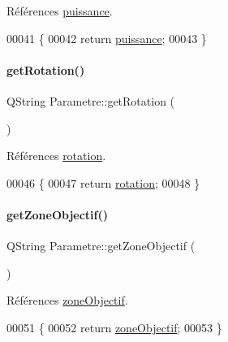 Références \hyperlink{class_parametre_aace4f0265742e479043b3e2afa33771e}{puissance}.


\begin{DoxyCode}
00041 \{
00042     \textcolor{keywordflow}{return} \hyperlink{class_parametre_aace4f0265742e479043b3e2afa33771e}{puissance};
00043 \}
\end{DoxyCode}
\mbox{\label{class_parametre_afdfb5ca638add3954d257ff95a8d8c53}} 
\paragraph{\texorpdfstring{get\+Rotation()}{getRotation()}}
{\footnotesize\ttfamily Q\+String Parametre\+::get\+Rotation (\begin{DoxyParamCaption}{ }\end{DoxyParamCaption})}



Références \hyperlink{class_parametre_ab8cd796bb232cba0abe0aab5b02ae52b}{rotation}.


\begin{DoxyCode}
00046 \{
00047     \textcolor{keywordflow}{return} \hyperlink{class_parametre_ab8cd796bb232cba0abe0aab5b02ae52b}{rotation};
00048 \}
\end{DoxyCode}
\mbox{\label{class_parametre_a2655cf5e0a69873da17dff9f51b4af70}} 
\paragraph{\texorpdfstring{get\+Zone\+Objectif()}{getZoneObjectif()}}
{\footnotesize\ttfamily Q\+String Parametre\+::get\+Zone\+Objectif (\begin{DoxyParamCaption}{ }\end{DoxyParamCaption})}



Références \hyperlink{class_parametre_a5c1b739e1a70e16ca09e6752743363aa}{zone\+Objectif}.


\begin{DoxyCode}
00051 \{
00052     \textcolor{keywordflow}{return} \hyperlink{class_parametre_a5c1b739e1a70e16ca09e6752743363aa}{zoneObjectif};
00053 \}
\end{DoxyCode}
\mbox{\label{class_parametre_a88864c08fcd1b45a98bc6db3cdf6e29c}} 
